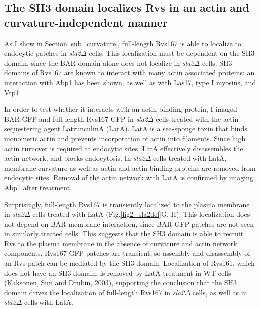 	\vspace{5mm}


	\subsection{The SH3 domain localizes Rvs in an actin and curvature-independent manner}
	\label{delsh3_latA}
As I show in Section.\ref{sub_curvature}, full-length Rvs167 is able to localize to endocytic patches in \textit{sla2$\Delta$} cells. This localization must be dependent on the SH3 domain, since the BAR domain alone does not localize in \textit{sla2$\Delta$} cells. SH3 domains of Rvs167 are known to interact with many actin associated proteins: an interaction with Abp1 has been shown, as well as with Las17, type I myosins, and Vrp1. 

	\vspace{5mm}
	
In order to test whether it interacts with an actin binding protein, I imaged BAR-GFP and full-length Rvs167-GFP in \textit{sla2$\Delta$} cells treated with the actin sequestering agent LatrunculinA (LatA). LatA is a sea-sponge toxin that binds monomeric actin and prevents incorporation of actin into filaments. Since high actin turnover is required at endocytic sites, LatA effectively disassembles the actin network, and blocks endocytosis. In \textit{sla2$\Delta$} cells treated with LatA, membrane curvature as well as actin and actin-binding proteins are removed from endocytic sites. Removal of the actin network with LatA is confirmed by imaging Abp1 after treatment.

	\vspace{5mm}
Surprisingly, full-length Rvs167 is transiently localized to the plasma membrane in \textit{sla2$\Delta$} cells treated with LatA (Fig.\ref{fig2_sla2del}G, H). This localization does not depend on BAR-membrane interaction, since BAR-GFP patches are not seen in similarly treated cells. This suggests that the SH3 domain is able to recruit Rvs to the plasma membrane in the absence of curvature and actin network components. Rvs167-GFP patches are transient, so assembly and disassembly of an Rvs patch can be mediated by the SH3 domain. Localization of Rvs161, which does not have an SH3 domain, is removed by LatA treatment in WT cells (Kaksonen, Sun and Drubin, 2003), supporting the conclusion that the SH3 domain drives the localization of full-length Rvs167 in \textit{sla2$\Delta$}  cells, as well as in \textit{sla2$\Delta$} cells with LatA. 


